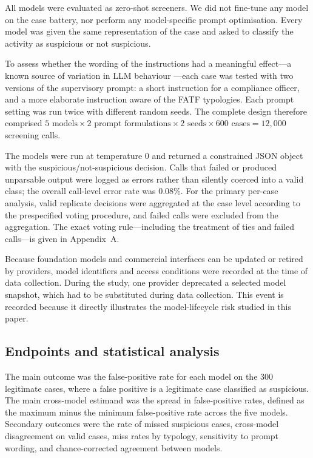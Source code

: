 \documentclass[pdflatex,sn-basic,Numbered]{sn-jnl}
\begin{document}
All models were evaluated as zero-shot screeners. We did not fine-tune any model on the case battery, nor perform any model-specific prompt optimisation. Every model was given the same representation of the case and asked to classify the activity as suspicious or not suspicious.

To assess whether the wording of the instructions had a meaningful effect---a known source of variation in LLM behaviour \cite{promptsens}---each case was tested with two versions of the supervisory prompt: a short instruction for a compliance officer, and a more elaborate instruction aware of the FATF typologies. Each prompt setting was run twice with different random seeds. The complete design therefore comprised $5 \text{ models} \times 2 \text{ prompt formulations} \times 2 \text{ seeds} \times 600 \text{ cases} = 12{,}000$ screening calls.

The models were run at temperature 0 and returned a constrained JSON object with the suspicious/not-suspicious decision. Calls that failed or produced unparsable output were logged as errors rather than silently coerced into a valid class; the overall call-level error rate was 0.08\%. For the primary per-case analysis, valid replicate decisions were aggregated at the case level according to the prespecified voting procedure, and failed calls were excluded from the aggregation. The exact voting rule---including the treatment of ties and failed calls---is given in Appendix~A.

Because foundation models and commercial interfaces can be updated or retired by providers, model identifiers and access conditions were recorded at the time of data collection. During the study, one provider deprecated a selected model snapshot, which had to be substituted during data collection. This event is recorded because it directly illustrates the model-lifecycle risk studied in this paper.

\subsection{Endpoints and statistical analysis}

The main outcome was the false-positive rate for each model on the 300 legitimate cases, where a false positive is a legitimate case classified as suspicious. The main cross-model estimand was the spread in false-positive rates, defined as the maximum minus the minimum false-positive rate across the five models. Secondary outcomes were the rate of missed suspicious cases, cross-model disagreement on valid cases, miss rates by typology, sensitivity to prompt wording, and chance-corrected agreement between models.
\end{document}
